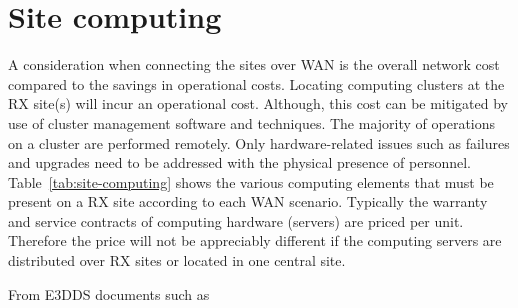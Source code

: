 \documentclass[12pt,a4paper]{article}
\begin{document}
\section{Site computing}
\label{sec:site-comp}

A consideration when connecting the \ED sites over WAN is the overall network cost compared to the savings in operational costs.
Locating computing clusters at the RX site(s) will incur an operational cost. Although, this cost can be mitigated by use of cluster management software and techniques.
The majority of operations on a cluster are performed remotely.
Only hardware-related issues such as failures and upgrades need to be addressed with the physical presence of personnel. 
Table~\ref{tab:site-computing} shows the various computing \einfra elements that must be present on a RX site according to each WAN scenario.
Typically the warranty and service contracts of computing hardware (servers) are priced per unit.
Therefore the price will not be appreciably different if the computing servers are distributed over RX sites or located in one central site.

From E3DDS documents such as~\cite{}



\newpage
{}

\end{document}

